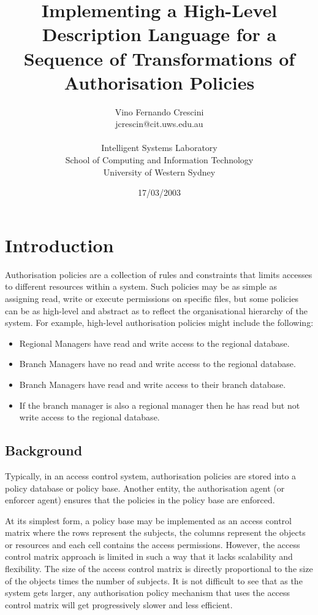 \documentclass[a4paper]{article}
\author{Vino Fernando Crescini\\jcrescin@cit.uws.edu.au\\\\Intelligent Systems Laboratory\\School of Computing and Information Technology\\University of Western Sydney}
\title{Implementing a High-Level Description Language for a Sequence of Transformations of Authorisation Policies}
\date{17/03/2003}
\begin{document}
  \maketitle
  \section{Introduction}

    Authorisation policies are a collection of rules and constraints that 
    limits accesses to different resources within a system. Such policies may 
    be as simple as assigning read, write or execute permissions on specific 
    files, but some policies can be as high-level and abstract as to reflect 
    the organisational hierarchy of the system. For example, high-level 
    authorisation policies might include the following:

    \begin{itemize}
      \item
        Regional Managers have read and write access to the regional database.
      \item
        Branch Managers have no read and write access to the regional database.
      \item 
        Branch Managers have read and write access to their branch database.
      \item 
         If the branch manager is also a regional manager then he has read
         but not write access to the regional database.
    \end{itemize}

    \subsection{Background}

      Typically, in an access control system, authorisation policies are stored
      into a policy database or policy base. Another entity, the authorisation
      agent (or enforcer agent) ensures that the policies in the policy base
      are enforced. 

      At its simplest form, a policy base may be implemented as an access
      control matrix where the rows represent the subjects, the columns
      represent the objects or resources and each cell contains the access
      permissions. However, the access control matrix approach is limited in
      such a way that it lacks scalability and flexibility. The size of the
      access control matrix is directly proportional to the size of the objects
      times the number of subjects. It is not difficult to see that as the
      system gets larger, any authorisation policy mechanism that uses the
      access control matrix will get progressively slower and less efficient.
\end{document}
